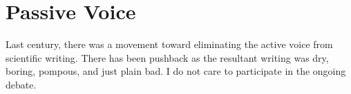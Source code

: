 \documentclass[12pt]{article}
\begin{document}
%




%
%



%
%
%
%
%








\section{Passive Voice}
%
%
Last century, there was  a movement toward eliminating the active voice from scientific writing. There has been pushback as the resultant writing was dry, boring,  pompous, and just plain bad. I do not care to participate in the ongoing debate. 
\end{document}
